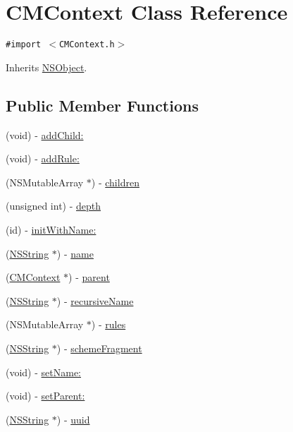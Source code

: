 \hypertarget{interface_c_m_context}{
\section{CMContext Class Reference}
\label{interface_c_m_context}
}
{\tt \#import $<$CMContext.h$>$}

Inherits \hyperlink{class_n_s_object}{NSObject}.

\subsection*{Public Member Functions}
\begin{CompactItemize}
\item 
(void) - \hyperlink{interface_c_m_context_2c1b7c478eb09a0fe18237991416462f}{addChild:}
\item 
(void) - \hyperlink{interface_c_m_context_836a1f40530fd5c09eb81a15ea61be43}{addRule:}
\item 
(NSMutableArray $\ast$) - \hyperlink{interface_c_m_context_2828bdd4fcd99c44429a54ed10d86dbb}{children}
\item 
(unsigned int) - \hyperlink{interface_c_m_context_c456cbfa10d53fcd6c7ec7fdab0644d5}{depth}
\item 
(id) - \hyperlink{interface_c_m_context_44890ef96f04231219626f757c7622dd}{initWithName:}
\item 
(\hyperlink{class_n_s_string}{NSString} $\ast$) - \hyperlink{interface_c_m_context_09bba5cf669815a66c52b7d9a7a04aff}{name}
\item 
(\hyperlink{interface_c_m_context}{CMContext} $\ast$) - \hyperlink{interface_c_m_context_097e65518b8aff7b0b4d7967eb303ccd}{parent}
\item 
(\hyperlink{class_n_s_string}{NSString} $\ast$) - \hyperlink{interface_c_m_context_274205e5dc456dc18d30fe1a187cbed2}{recursiveName}
\item 
(NSMutableArray $\ast$) - \hyperlink{interface_c_m_context_3172da5bae6fbeb71d260b18140df650}{rules}
\item 
(\hyperlink{class_n_s_string}{NSString} $\ast$) - \hyperlink{interface_c_m_context_1341d62c2d2eee6cfb60a44a5cbafd8d}{schemeFragment}
\item 
(void) - \hyperlink{interface_c_m_context_582070ae69c46783271f513aff1f74e7}{setName:}
\item 
(void) - \hyperlink{interface_c_m_context_61e3e9525bfb5c4beeb9c9c9f07b7f3d}{setParent:}
\item 
(\hyperlink{class_n_s_string}{NSString} $\ast$) - \hyperlink{interface_c_m_context_a3920f2822db39752c950c0606cad3a5}{uuid}
\end{CompactItemize}
